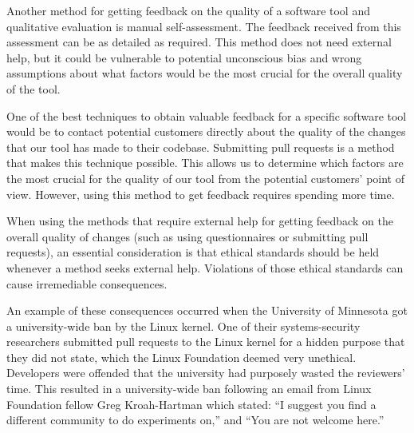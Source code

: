 Another method for getting feedback on the quality of a software tool and qualitative evaluation is manual self-assessment. The feedback received from this assessment can be as detailed as required. This method does not need external help, but it could be vulnerable to potential unconscious bias and wrong assumptions about what factors would be the most crucial for the overall quality of the tool.

One of the best techniques to obtain valuable feedback for a specific software tool would be to contact potential customers directly about the quality of the changes that our tool has made to their codebase. Submitting pull requests is a method that makes this technique possible. This allows us to determine which factors are the most crucial for the quality of our tool from the potential customers' point of view. However, using this method to get feedback requires spending more time.

When using the methods that require external help for getting feedback on the overall quality of changes (such as using questionnaires or submitting pull requests), an essential consideration is that ethical standards should be held whenever a method seeks external help. Violations of those ethical standards can cause irremediable consequences.

An example of these consequences occurred when the University of Minnesota got a university-wide ban by the Linux kernel. One of their systems-security researchers submitted pull requests to the Linux kernel for a hidden purpose that they did not state, which the Linux Foundation deemed very unethical. Developers were offended that the university had purposely wasted the reviewers' time. This resulted in a university-wide ban following an email from Linux Foundation fellow Greg Kroah-Hartman which stated: ``I suggest you find a different community to do experiments on,'' and ``You are not welcome here.''~\cite{minnesota_banned}
